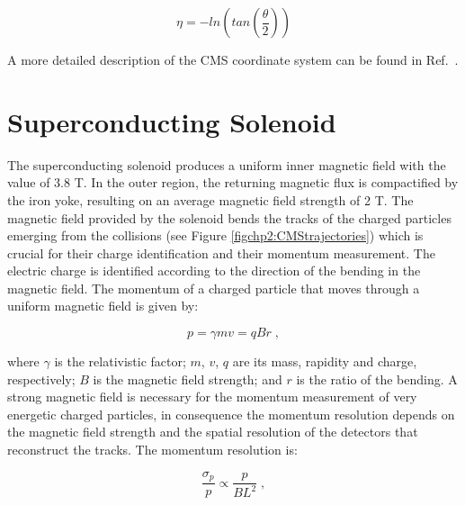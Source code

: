 \begin{equation}
 \eta = -ln \left( tan \left(\frac{\theta}{2} \right) \right)
\end{equation}


\noindent A more detailed description of the CMS coordinate system can be 
found in Ref.~\cite{chp2:CMS}. 

\section{Superconducting Solenoid}
\label{sec:Solenoid}

\noindent The superconducting solenoid produces a uniform inner magnetic 
field with the value of 3.8 T. In the outer region, the 
returning magnetic flux is compactified by the iron yoke, resulting 
on an average magnetic field strength of 2 T. The magnetic field 
provided by the solenoid bends the tracks of the charged particles 
emerging from the collisions (see Figure \ref{figchp2:CMStrajectories}) which is crucial
for their charge identification and their momentum measurement. The electric charge 
is identified according to the direction of the
bending in the magnetic field. The momentum of a charged particle 
that moves through a uniform magnetic field is given by:

\begin{equation}
p = \gamma m v = qBr \;, 
\end{equation}

\noindent where $\gamma$ is the relativistic factor; $m$, $v$, $q$ are its mass,
rapidity and charge, respectively; $B$ is the magnetic field strength; and $r$ is the ratio 
of the bending. A strong magnetic field is necessary for the momentum 
measurement of very energetic charged particles, in consequence the momentum resolution 
depends on the magnetic field strength and the spatial resolution of the detectors 
that reconstruct the tracks. The momentum resolution is:

\begin{equation}
 \frac{\sigma_{p}}{p} \propto \frac{p}{BL^{2}} \;,
\end{equation}

